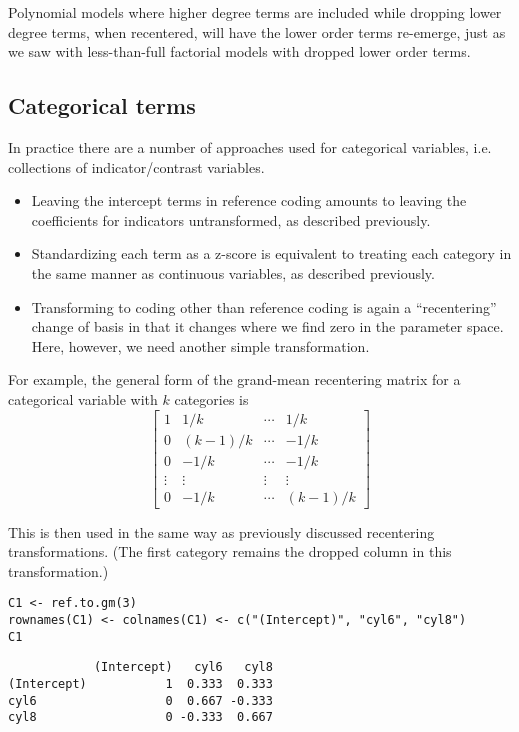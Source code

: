 \documentclass[]{article}
\providecommand{\tightlist}{%
  \setlength{\itemsep}{0pt}\setlength{\parskip}{0pt}}
\begin{document}
Polynomial models where higher degree terms are included while dropping
lower degree terms, when recentered, will have the lower order terms
re-emerge, just as we saw with less-than-full factorial models with
dropped lower order terms.

\hypertarget{categorical-terms}{%
\subsection{Categorical terms}\label{categorical-terms}}

In practice there are a number of approaches used for categorical
variables, i.e. collections of indicator/contrast variables.

\begin{itemize}
\tightlist
\item
  Leaving the intercept terms in reference coding amounts to leaving the
  coefficients for indicators untransformed, as described previously.
\item
  Standardizing each term as a z-score is equivalent to treating each
  category in the same manner as continuous variables, as described
  previously.
\item
  Transforming to coding other than reference coding is again a
  ``recentering'' change of basis in that it changes where we find zero
  in the parameter space. Here, however, we need another simple
  transformation.
\end{itemize}

For example, the general form of the grand-mean recentering matrix for a
categorical variable with \(k\) categories is \[
\begin{bmatrix}
1 &1/k     &\cdots &1/k \\
0 &(k-1)/k &\cdots &-1/k \\
0 &-1/k    &\cdots &-1/k \\
\vdots &\vdots &\vdots &\vdots \\
0 &-1/k    &\cdots &(k-1)/k
\end{bmatrix}
\]

This is then used in the same way as previously discussed recentering
transformations. (The first category remains the dropped column in this
transformation.)

\begin{verbatim}
C1 <- ref.to.gm(3)
rownames(C1) <- colnames(C1) <- c("(Intercept)", "cyl6", "cyl8")
C1
\end{verbatim}

\begin{verbatim}
            (Intercept)   cyl6   cyl8
(Intercept)           1  0.333  0.333
cyl6                  0  0.667 -0.333
cyl8                  0 -0.333  0.667
\end{verbatim}
\end{document}
